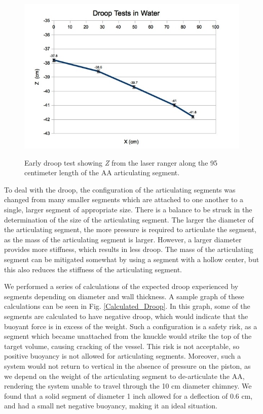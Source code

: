   \begin{figure}
  \caption{Early droop test showing \emph{Z} from the laser ranger along the 95 centimeter length of the AA articulating segment.}
  \includegraphics[width=\textwidth]{AA/Droop_1.jpg}
  \label{Droop_1}
  \end{figure}

To deal with the droop, the configuration of the articulating segments was changed from many smaller segments which are attached to one another to a single, larger segment of appropriate size. There is a balance to be struck in the determination of the size of the articulating segment. The larger the diameter of the articulating segment, the more pressure is required to articulate the segment, as the mass of the articulating segment is larger. However, a larger diameter provides more stiffness, which results in less droop. The mass of the articulating segment can be mitigated somewhat by using a segment with a hollow center, but this also reduces the stiffness of the articulating segment. 

We performed a series of calculations of the expected droop experienced by segments depending on diameter and wall thickness. A sample graph of these calculations can be seen in Fig. \ref{Calculated_Droop}. In this graph, some of the segments are calculated to have negative droop, which would indicate that the buoyant force is in excess of the weight. Such a configuration is a safety risk, as a segment which became unattached from the knuckle would strike the top of the target volume, causing cracking of the vessel. This risk is not acceptable, so positive buoyancy is not allowed for articulating segments. Moreover, such a system would not return to vertical in the absence of pressure on the piston, as we depend on the weight of the articulating segment to de-articulate the AA, rendering the system unable to travel through the 10 cm diameter chimney. We found that a solid segment of diameter 1 inch allowed for a deflection of 0.6 cm, and had a small net negative buoyancy, making it an ideal situation. 


